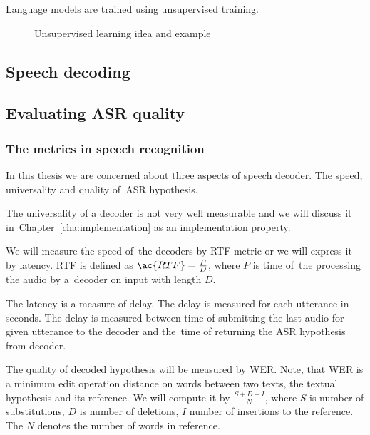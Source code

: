 {Language models are trained using unsupervised training. 

\begin{figure}[!htp]
    \begin{center}
    
    \caption{Unsupervised learning idea and example}
    \label{fig:unsupervised} 
    \end{center}
\end{figure}

\subsection{Speech decoding}
\label{sub:decode}

\subsection{Evaluating \ac{ASR} quality}
\label{sub:eval}

\subsubsection*{The metrics in speech recognition}
\label{sub:the_metrics_in_speech_recognition}
In this thesis we are concerned about three aspects of speech decoder.
The speed, universality and quality of~\ac{ASR} hypothesis.

The universality of a decoder is not very well measurable and we will discuss it 
in~Chapter~\ref{cha:implementation} as an implementation property.

We will measure the speed of~the decoders by \acl{RTF} metric or we will express it by latency.
\ac{RTF} is defined as $\ac{RTF} = \frac{P}{D}$, where $P$ is time of~the processing the audio by a~decoder on input with length $D$. 

The latency is a measure of delay. The delay is measured for each utterance in seconds. 
The delay is measured between time of submitting the last audio for given utterance to the decoder and 
the~time of returning the \ac{ASR} hypothesis from decoder.

The quality of decoded hypothesis will be measured by \ac{WER}.
Note, that \ac{WER} is a minimum edit operation distance on words between two texts, the textual hypothesis
and its reference.
We will compute it by $\frac{S+D+I}{N}$, where $S$ is number of substitutions,
$D$ is number of deletions, $I$ number of insertions to the reference. 
The $N$ denotes the number of words in reference.

}

